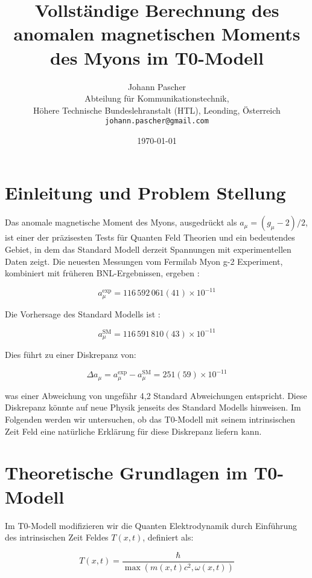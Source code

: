 \documentclass[12pt,a4paper]{article}
\title{Vollständige Berechnung des anomalen magnetischen Moments des Myons im T0-Modell}
\author{Johann Pascher\\
	Abteilung für Kommunikationstechnik, \\Höhere Technische Bundeslehranstalt (HTL), Leonding, Österreich\\
	\texttt{johann.pascher@gmail.com}}
\date{\today}
\begin{document}
	
	\maketitle
	
	\tableofcontents
	\newpage
	
	\section{Einleitung und Problem Stellung}

	
	Das anomale magnetische Moment des Myons, ausgedrückt als $a_\mu = (g_\mu-2)/2$, ist einer der präzisesten Tests für Quanten Feld Theorien und ein bedeutendes Gebiet, in dem das Standard Modell derzeit Spannungen mit experimentellen Daten zeigt. Die neuesten Messungen vom Fermilab Myon g-2 Experiment, kombiniert mit früheren BNL-Ergebnissen, ergeben \cite{Muong-2:2021ojo}:
	
	\begin{equation}
		a_\mu^{\text{exp}} = 116\,592\,061(41) \times 10^{-11}
	\end{equation}
	
	Die Vorhersage des Standard Modells ist \cite{Aoyama2020}:
	
	\begin{equation}
		a_\mu^{\text{SM}} = 116\,591\,810(43) \times 10^{-11}
	\end{equation}
	
	Dies führt zu einer Diskrepanz von:
	
	\begin{equation}
		\Delta a_\mu = a_\mu^{\text{exp}} - a_\mu^{\text{SM}} = 251(59) \times 10^{-11}
	\end{equation}
	
	was einer Abweichung von ungefähr 4,2 Standard Abweichungen entspricht. Diese Diskrepanz könnte auf neue Physik jenseits des Standard Modells hinweisen. Im Folgenden werden wir untersuchen, ob das T0-Modell mit seinem intrinsischen Zeit Feld eine natürliche Erklärung für diese Diskrepanz liefern kann.
	
	\section{Theoretische Grundlagen im T0-Modell}
	
	Im T0-Modell modifizieren wir die Quanten Elektrodynamik durch Einführung des intrinsischen Zeit Feldes $T(x,t)$, definiert als:
	
	\begin{equation}
		T(x,t) = \frac{\hbar}{\max(m(x,t)c^2, \omega(x,t))}
	\end{equation}
	
\end{document}
